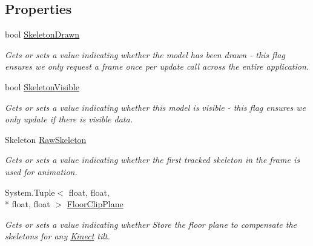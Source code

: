 \subsection*{Properties}
\begin{DoxyCompactItemize}
\item 
bool \hyperlink{class_microsoft_1_1_samples_1_1_kinect_1_1_avateering_1_1_avatar_animator_aac2c33858a422df79802e332db84fcd1}{Skeleton\+Drawn}
\begin{DoxyCompactList}\small\item\em Gets or sets a value indicating whether the model has been drawn -\/ this flag ensures we only request a frame once per update call across the entire application. \end{DoxyCompactList}\item 
bool \hyperlink{class_microsoft_1_1_samples_1_1_kinect_1_1_avateering_1_1_avatar_animator_a3185fd0fe9fd0db6d0ac75083a490c4c}{Skeleton\+Visible}
\begin{DoxyCompactList}\small\item\em Gets or sets a value indicating whether this model is visible -\/ this flag ensures we only update if there is visible data. \end{DoxyCompactList}\item 
Skeleton \hyperlink{class_microsoft_1_1_samples_1_1_kinect_1_1_avateering_1_1_avatar_animator_ae4db88033826109723fb2ddf97f1331a}{Raw\+Skeleton}
\begin{DoxyCompactList}\small\item\em Gets or sets a value indicating whether the first tracked skeleton in the frame is used for animation. \end{DoxyCompactList}\item 
System.\+Tuple$<$ float, float, \\*
float, float $>$ \hyperlink{class_microsoft_1_1_samples_1_1_kinect_1_1_avateering_1_1_avatar_animator_a3f5a9221dc2119e038dca80bae049d8a}{Floor\+Clip\+Plane}
\begin{DoxyCompactList}\small\item\em Gets or sets a value indicating whether Store the floor plane to compensate the skeletons for any \hyperlink{namespace_microsoft_1_1_samples_1_1_kinect}{Kinect} tilt. \end{DoxyCompactList}\item 

\end{DoxyCompactItemize}

